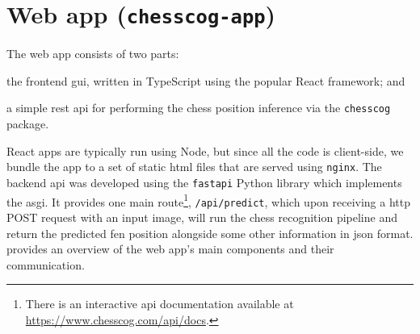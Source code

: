 \documentclass[../main.tex]{subfiles}
\begin{document}
\section{Web app (\texttt{chesscog-app})}
\label{sec:implementation_chesscogapp}
The web app consists of two parts:
\begin{enumerate*}[label=(\roman*)]
    \item the frontend \gls{gui}, written in TypeScript using the popular React framework; and
    \item a simple \gls{rest} \gls{api} for performing the chess position inference via the \texttt{chesscog} package.
\end{enumerate*}
React apps are typically run using Node, but since all the code is client-side, we bundle the app to a set of static \gls{html} files that are served using \texttt{nginx}.
The backend \gls{api} was developed using the \texttt{fastapi} Python library which implements the \gls{asgi}.
It provides one main route\footnote{There is an interactive \gls{api} documentation available at \url{https://www.chesscog.com/api/docs}.}, \texttt{/api/predict}, which upon receiving a \gls{http} POST request with an input image, will run the chess recognition pipeline and return the predicted \gls{fen} position alongside some other information in \gls{json} format.
 provides an overview of the web app's main components and their communication.
\end{document}
